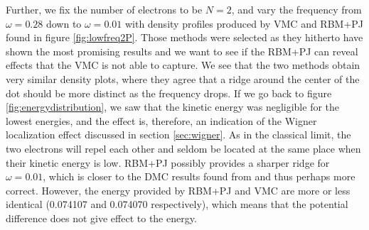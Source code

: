 Further, we fix the number of electrons to be $N=2$, and vary the frequency from $\omega=0.28$ down to $\omega=0.01$ with density profiles produced by VMC and RBM+PJ found in figure \eqref{fig:lowfreq2P}. Those methods were selected as they hitherto have shown the most promising results and we want to see if the RBM+PJ can reveal effects that the VMC is not able to capture. We see that the two methods obtain very similar density plots, where they agree that a ridge around the center of the dot should be more distinct as the frequency drops. If we go back to figure \eqref{fig:energydistribution}, we saw that the kinetic energy was negligible for the lowest energies, and the effect is, therefore, an indication of the Wigner localization effect discussed in section \ref{sec:wigner}. As in the classical limit, the two electrons will repel each other and seldom be located at the same place when their kinetic energy is low. RBM+PJ possibly provides a sharper ridge for $\omega=0.01$, which is closer to the DMC results found from \citet{hogberget_quantum_2013} and thus perhaps more correct. However, the energy provided by RBM+PJ and VMC are more or less identical (0.074107 and 0.074070 respectively), which means that the potential difference does not give effect to the energy.

